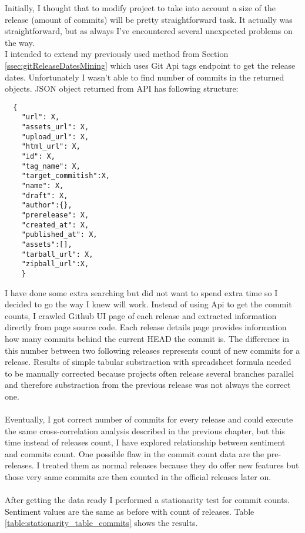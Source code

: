 Initially, I thought that to modify project to take into account a size of the release (amount of commits) will be pretty straightforward task. It actually was straightforward, but as always I've encountered several unexpected problems on the way. \\
I intended to extend my previously used method from Section \ref{ssec:gitReleaseDatesMining} which uses Git Api tags endpoint to get the release dates. Unfortunately I wasn't able to find number of commits in the returned objects. JSON object returned from API has following structure:
\begin{lstlisting}
  {
    "url": X,
    "assets_url": X,
    "upload_url": X,
    "html_url": X,
    "id": X,
    "tag_name": X,
    "target_commitish":X,
    "name": X,
    "draft": X,
    "author":{},
    "prerelease": X,
    "created_at": X,
    "published_at": X,
    "assets":[],
    "tarball_url": X,
    "zipball_url":X, 
    }
\end{lstlisting}
I have done some extra searching but did not want to spend extra time so I decided to go the way I knew will work. Instead of using Api to get the commit counts, I crawled Github UI page of each release and extracted information directly from page source code. Each release details page provides information how many commits behind the current HEAD the commit is. The difference in this number between two following releases represents count of new commits for a release. Results of simple tabular substraction with spreadsheet formula needed to be manually corrected because projects often release several branches parallel and therefore substraction from the previous release was not always the correct one.\\
\\
Eventually, I got correct number of commits for every release and could execute the same cross-correlation analysis described in the previous chapter, but this time instead of releases count, I have explored relationship between sentiment and commits count. One possible flaw in the commit count data are the pre-releases. I treated them as normal releases because they do offer new features but those very same commits are then counted in the official releases later on.\\
\\
After getting the data ready I performed a stationarity test for commit counts. Sentiment values are the same as before with count of releases. Table \ref{table:stationarity_table_commits} shows the results.

